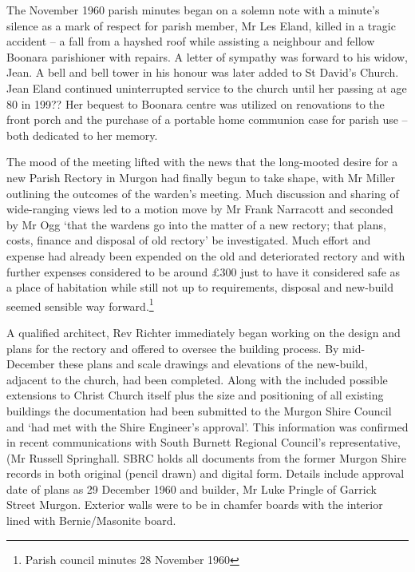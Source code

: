 The November 1960 parish minutes began on a solemn note with a minute's silence as a mark of respect for parish member, Mr Les Eland, killed in a tragic accident -- a fall from a hayshed roof while assisting a neighbour and fellow Boonara parishioner with repairs. A letter of sympathy was forward to his widow, Jean. A bell and bell tower in his honour was later added to St David's Church. Jean Eland continued uninterrupted service to the church until her passing at age 80 in 199?? Her bequest to Boonara centre was utilized on renovations to the front porch and the purchase of a portable home communion case for parish use -- both dedicated to her memory.



The mood of the meeting lifted with the news that the long-mooted desire for a new Parish Rectory in Murgon had finally begun to take shape, with Mr Miller outlining the outcomes of the warden's meeting. Much discussion and sharing of wide-ranging views led to a motion move by Mr Frank Narracott and seconded by Mr Ogg `that the wardens go into the matter of a new rectory; that plans, costs, finance and disposal of old rectory' be investigated. Much effort and expense had already been expended on the old and deteriorated rectory and with further expenses considered to be around \pounds300 just to have it considered safe as a place of habitation while still not up to requirements, disposal and new-build seemed sensible way forward.\footnote{Parish council minutes 28 November 1960}


A qualified architect, Rev Richter immediately began working on the design and plans for the rectory and offered to oversee the building process. By mid-December these plans and scale drawings and elevations of the new-build, adjacent to the church, had been completed. Along with the included possible extensions to Christ Church itself plus the size and positioning of all existing buildings the documentation had been submitted to the Murgon Shire Council and `had met with the Shire Engineer's approval'. This information was confirmed in recent communications with South Burnett Regional Council's representative, (Mr Russell Springhall. SBRC holds all documents from the former Murgon Shire records in both original (pencil drawn) and digital form. Details include approval date of plans as 29 December 1960 and builder, Mr Luke Pringle of Garrick Street Murgon. Exterior walls were to be in chamfer boards with the interior lined with Bernie/Masonite board.



